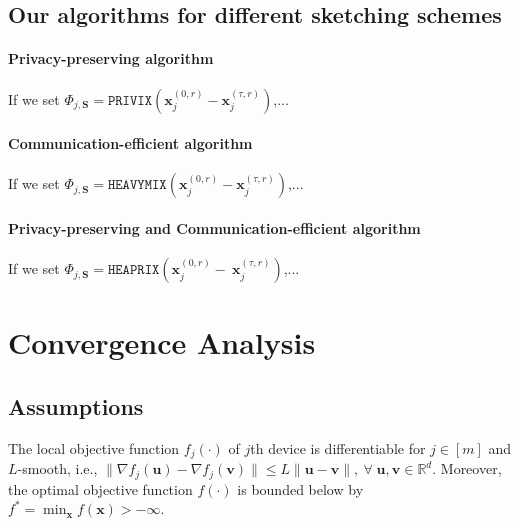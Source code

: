 
\subsection{Our algorithms for different sketching schemes}
\paragraph{Privacy-preserving algorithm}
If we set  $\Phi_{j,\mathbf{S}}=\texttt{PRIVIX}\left(\boldsymbol{x}_j^{(0,r)}-\boldsymbol{x}_j^{(\tau,r)}\right)$,...

\paragraph{Communication-efficient algorithm}
If we set  $\Phi_{j,\mathbf{S}}=\texttt{HEAVYMIX}\left(\boldsymbol{x}_j^{(0,r)}-\boldsymbol{x}_j^{(\tau,r)}\right)$,...
\paragraph{Privacy-preserving and Communication-efficient algorithm}
If we set  $\Phi_{j,\mathbf{S}}=\texttt{HEAPRIX}\left(\boldsymbol{x}_j^{(0,r)}-~{\boldsymbol{x}}_{j}^{(\tau,r)}\right)$,...








\section{Convergence Analysis}

\subsection{Assumptions}


\begin{assumption}\label{Assu:1}
The local objective function $f_j(\cdot)$ of $j$th device is differentiable for $j\in [m]$ and $L$-smooth, i.e., $\|\nabla f_j(\boldsymbol{u})-\nabla f_j(\mathbf{v})\|\leq L\|\boldsymbol{u}-\mathbf{v}\|,\: \forall \;\boldsymbol{u},\mathbf{v}\in\mathbb{R}^d$. Moreover, the optimal objective function $f(\cdot)$ is bounded below by ${f^*} = \min_{\boldsymbol{x}} f(\boldsymbol{x})>-\infty$. 
\end{assumption}

